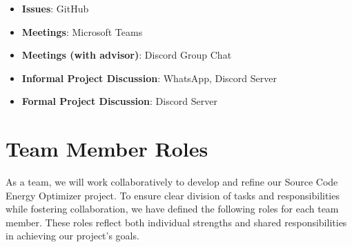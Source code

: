 \documentclass{article}
\begin{document}
\begin{itemize}

    \item \textbf{Issues}: GitHub 
    \item \textbf{Meetings}: Microsoft Teams 
    \item \textbf{Meetings (with advisor)}: Discord Group Chat
    \item \textbf{Informal Project Discussion}: WhatsApp, Discord Server
    \item \textbf{Formal Project Discussion}: Discord Server
    
\end{itemize}


\section{Team Member Roles}

As a team, we will work collaboratively to develop and refine our Source Code Energy Optimizer project. To ensure clear division 
of tasks and responsibilities while fostering collaboration, we have defined the following roles for each team member. These roles 
reflect both individual strengths and shared responsibilities in achieving our project’s goals.
\end{document}
